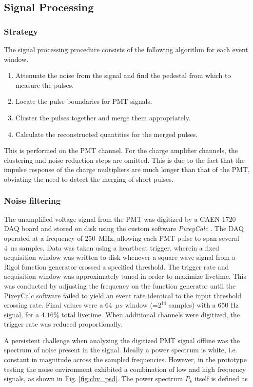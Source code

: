 \subsection {Signal Processing}
\subsubsection{Strategy}
The signal processing procedure consists of the following algorithm for each event window.
\begin{enumerate}
    \item Attenuate the noise from the signal and find the pedestal from which to measure the pulses.
    \item Locate the pulse boundaries for PMT signals.
    \item Cluster the pulses together and merge them appropriately.
    \item Calculate the reconstructed quantities for the merged pulses.
\end{enumerate}

This is performed on the PMT channel. 
For the charge amplifier channels, the clustering and noise reduction steps are omitted.
This is due to the fact that the impulse response of the charge multipliers are much longer than that of the PMT, obviating the need to detect the merging of short pulses.


\subsubsection{Noise filtering}
The unamplified voltage signal from the PMT was digitized by a CAEN 1720 DAQ board and stored on disk using the custom software \textit{PixeyCalc} \cite{bodnia_electric_2021}.
The DAQ operated at a frequency of 250~MHz, allowing each PMT pulse to span several 4~ns samples.
Data was taken using a heartbeat trigger, wherein a fixed acquisition window was written to disk whenever a square wave signal from a Rigol function generator crossed a specified threshold.
The trigger rate and acquisition window was approximately tuned in order to maximize livetime.
This was conducted by adjusting the frequency on the function generator until the PixeyCalc software failed to yield an event rate identical to the input threshold crossing rate.
Final values were a 64~$\mu s$ window (=$2^{14}$ samples) with a 650 Hz signal, for a $4.16\%$ total livetime.
When additional channels were digitized, the trigger rate was reduced  proportionally.


A persistent challenge when analyzing the digitized PMT signal offline was the spectrum of noise present in the signal.
Ideally a power spectrum is white, i.e. constant in magnitude across the sampled frequencies.
However, in the prototype testing the noise environment exhibited a combination of low and high frequency signals, as shown in Fig. \ref{fig:chv_psd}.
The power spectrum $P_k$ itself is defined as


